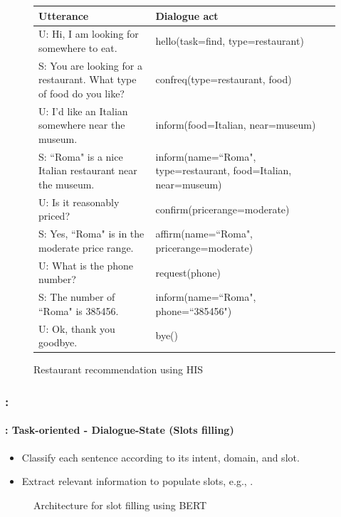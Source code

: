 \documentclass[xcolor=table]{beamer}
\begin{document}
\begin{frame}
\begin{figure}
		\begin{tabular}{p{}p{}}
			\hline
			Utterance & Dialogue act\\
			\hline
			U: Hi, I am looking for somewhere to eat.  & hello(task=find, type=restaurant) \\
			S: You are looking for a restaurant. What type of food do you like?  & confreq(type=restaurant, food) \\
			U: I'd like an Italian somewhere near the museum. & inform(food=Italian, near=museum)\\
			S: ``Roma" is a nice Italian restaurant near the museum.  & inform(name=``Roma", type=restaurant, food=Italian, near=museum) \\
			U: Is it reasonably priced? & confirm(pricerange=moderate) \\
			S: Yes, ``Roma" is in the moderate price range.  & affirm(name=``Roma", pricerange=moderate) \\
			U: What is the phone number? & request(phone) \\
			S: The number of ``Roma" is 385456. & inform(name=``Roma", phone=``385456") \\
			U: Ok, thank you goodbye. & bye() \\
			\hline
		\end{tabular}
		
		\caption{Restaurant recommendation using HIS \cite{2010-young-al}}
	\end{figure}
	
\end{frame}

\begin{frame}
	\frametitle{\insertshortsubtitle: \insertsection}
	\framesubtitle{\insertsubsection: Task-oriented - Dialogue-State (Slots filling)}
	
	\begin{itemize}
		\item Classify each sentence according to its intent, domain, and slot.
		\item Extract relevant information to populate slots, e.g., .
	\end{itemize}
	
	\begin{figure}
		\centering
		\caption{Architecture for slot filling using BERT \cite{2020-jurafsky-martin}}
	\end{figure}
	
\end{frame}
\end{document}
